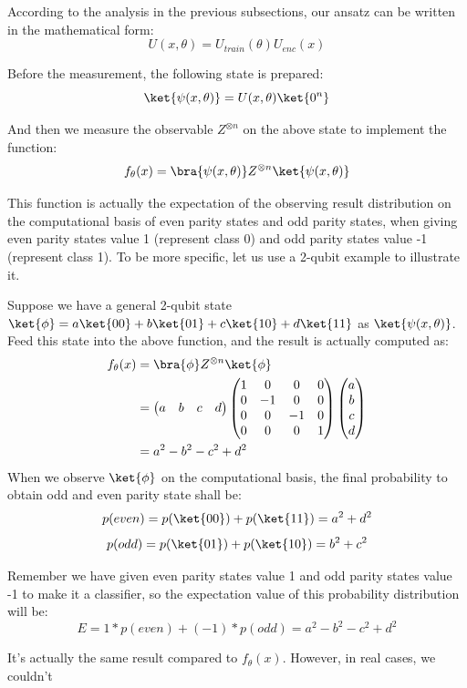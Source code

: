 \documentclass[sigconf]{acmart}
\begin{document}
According to the analysis in the previous subsections, our  ansatz can be written in the mathematical form:
$$U(x,\theta)=U_{train}(\theta)U_{enc}(x)$$

Before the measurement, the following state is prepared:
$$\ket{\psi(x,\theta)}=U(x,\theta)\ket{0^n}$$

And then we measure the observable $Z^{\otimes n}$ on the above state to implement the function:
$$f_\theta(x)=\bra{\psi(x,\theta)}Z^{\otimes n}\ket{\psi(x,\theta)}$$  

This function is actually the expectation of the observing result distribution on the computational basis of even parity states and odd parity states, when giving even parity states value 1 (represent class 0) and odd parity states value -1 (represent class 1). To be more specific, let us use a 2-qubit example to illustrate it.

Suppose we have a general 2-qubit state $\ket{\phi}=a\ket{00}+b\ket{01}+c\ket{10}+d\ket{11}$ as $\ket{\psi(x,\theta)}$. Feed this state into the above function, and the result is actually computed as:
\begin{align*}
	f_\theta(x)&=\bra{\phi}Z^{\otimes n}\ket{\phi}\\
	&=\begin{pmatrix}
		a & b & c & d
		\end{pmatrix}\begin{pmatrix}
		1 & 0 & 0 & 0 \\
		0 & -1 & 0 & 0 \\
		0 & 0 & -1 & 0 \\
		0 & 0 & 0 & 1 
	\end{pmatrix}\begin{pmatrix}
	a \\
	b \\
	c \\
	d 
	\end{pmatrix}\\
    &=a^2-b^2-c^2+d^2
\end{align*}
When we observe $\ket{\phi}$ on the computational basis, the final probability to obtain odd and even parity state shall be:
$$p(even)=p(\ket{00})+p(\ket{11})=a^2+d^2$$
$$p(odd)=p(\ket{01})+p(\ket{10})=b^2+c^2$$

Remember we have given even parity states value 1 and odd parity states value -1 to make it a classifier, so the expectation value of this probability distribution will be:
$$E=1*p(even)+(-1)*p(odd)=a^2-b^2-c^2+d^2$$

It's actually the same result compared to $f_{\theta}(x)$. However, in real cases, we couldn't  
\end{document}

